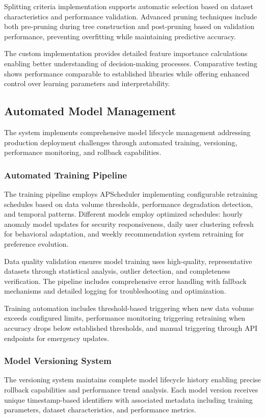 \documentclass[12pt]{article}
\begin{document}
Splitting criteria implementation supports automatic selection based on dataset characteristics and performance validation. Advanced pruning techniques include both pre-pruning during tree construction and post-pruning based on validation performance, preventing overfitting while maintaining predictive accuracy.

The custom implementation provides detailed feature importance calculations enabling better understanding of decision-making processes. Comparative testing shows performance comparable to established libraries while offering enhanced control over learning parameters and interpretability.

\subsection{Automated Model Management}
The system implements comprehensive model lifecycle management addressing production deployment challenges through automated training, versioning, performance monitoring, and rollback capabilities.

\subsubsection{Automated Training Pipeline}
The training pipeline employs APScheduler implementing configurable retraining schedules based on data volume thresholds, performance degradation detection, and temporal patterns. Different models employ optimized schedules: hourly anomaly model updates for security responsiveness, daily user clustering refresh for behavioral adaptation, and weekly recommendation system retraining for preference evolution.

Data quality validation ensures model training uses high-quality, representative datasets through statistical analysis, outlier detection, and completeness verification. The pipeline includes comprehensive error handling with fallback mechanisms and detailed logging for troubleshooting and optimization.

Training automation includes threshold-based triggering when new data volume exceeds configured limits, performance monitoring triggering retraining when accuracy drops below established thresholds, and manual triggering through API endpoints for emergency updates.

\subsubsection{Model Versioning System}
The versioning system maintains complete model lifecycle history enabling precise rollback capabilities and performance trend analysis. Each model version receives unique timestamp-based identifiers with associated metadata including training parameters, dataset characteristics, and performance metrics.
\end{document}
